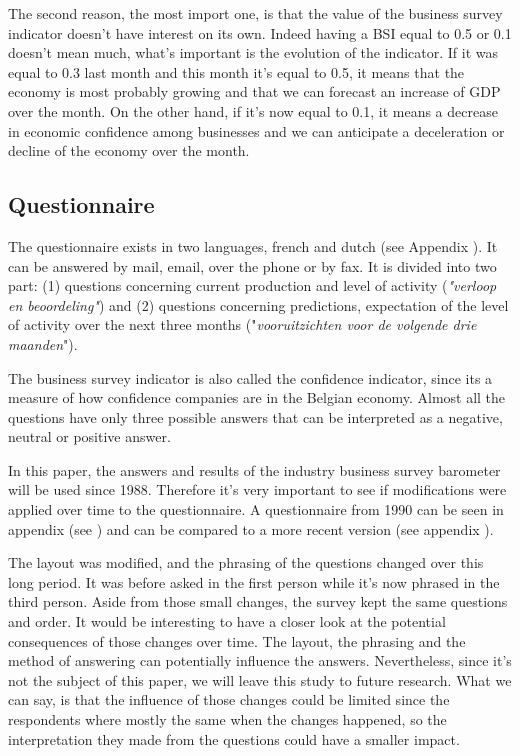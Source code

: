 \documentclass[12pt,a4paper,oneside]{book}
\begin{document}
The second reason, the most import one, is that the value of the business survey indicator doesn't have interest on its own. Indeed having a BSI equal to 0.5 or 0.1 doesn't mean much, what's important is the evolution of the indicator. If it was equal to 0.3 last month and this month it's equal to 0.5, it means that the economy is most probably growing and that we can forecast an increase of GDP over the month. On the other hand, if it's now equal to 0.1, it means a decrease in economic confidence among businesses and we can anticipate a deceleration or decline of the economy over the month.



\subsection{Questionnaire}
\label{sec:Questionnaire}

The questionnaire exists in two languages, french and dutch (see Appendix ). It can be answered by mail, email, over the phone or by fax.
It is divided into two part:
(1) questions concerning current production and level of activity (\textit{"verloop en beoordeling"}) and
(2) questions concerning predictions, expectation of the level of activity over the next three months ("\textit{vooruitzichten voor de volgende drie maanden}").

The business survey indicator is also called the confidence indicator, since its a measure of how confidence companies are in the Belgian economy.
Almost all the questions have only three possible answers that can be interpreted as a negative, neutral or positive answer.

In this paper, the answers and results of the industry business survey barometer will be used since 1988. Therefore it's very important to see if modifications were applied over time to the questionnaire.
A questionnaire from 1990 can be seen in appendix (see ) and can be compared to a more recent version (see appendix ).

The layout was modified, and the phrasing of the questions changed over this long period. It was before asked in the first person while it's now phrased in the third person. Aside from those small changes, the survey kept the same questions and order.
It would be interesting to have a closer look at the potential consequences of those changes over time. The layout, the phrasing and the method of answering can potentially influence the answers. Nevertheless, since it's not the subject of this paper, we will leave this study to future research.
What we can say, is that the influence of those changes could be limited since the respondents where mostly the same when the changes happened, so the interpretation they made from the questions could have a smaller impact.
\end{document}
